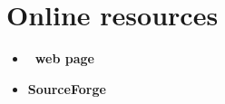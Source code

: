 \section*{Online resources}

\begin{itemize}

\item {\bf \topspin\ web page } \texttt{\topspinwebpage}

\item {\bf SourceForge } \texttt{\sourceforgepage}

\end{itemize}
